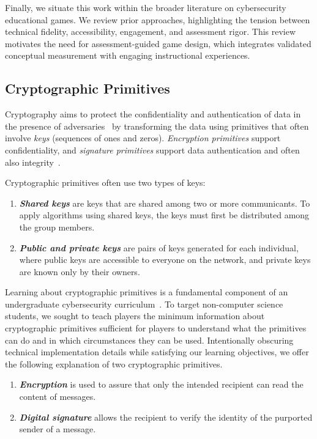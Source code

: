 \documentclass{uofithesis}
\begin{document}
Finally, we situate this work within the broader literature on cybersecurity educational games. We review prior approaches, highlighting the tension between technical fidelity, accessibility, engagement, and assessment rigor. This review motivates the need for assessment-guided game design, which integrates validated conceptual measurement with engaging instructional experiences.

\subsection{Cryptographic Primitives}
Cryptography aims to protect the confidentiality and authentication of
data in the presence of adversaries~\cite{WhatCryptography}
by transforming the data using primitives that often involve
\textit{keys} (sequences of ones and zeros).
\textit{Encryption primitives} support confidentiality, and \textit{signature primitives} support data authentication and often also integrity~\cite{TeachingPermitive}.

Cryptographic primitives often use two types of keys:
\begin{enumerate}
    \item \textit{\textbf{Shared keys}} are keys that are shared among two or more communicants. To apply algorithms using shared keys, the keys must first be distributed among the group members.
    \item \textit{\textbf{Public and private keys}} are pairs of keys generated for each individual, where public keys are accessible to everyone on the network, and private keys are known only by their owners.
\end{enumerate}
Learning about cryptographic primitives is a fundamental component of an undergraduate cybersecurity curriculum~\cite{TeachingPermitive}. 
To target non-computer science students, we sought to teach players the minimum information
about cryptographic primitives sufficient for players to understand 
what the primitives can do and in which circumstances they can be used.
Intentionally obscuring technical implementation details
while satisfying our learning objectives, we offer
the following explanation of two cryptographic primitives.
\begin{enumerate}
    \item \textbf{\textit{Encryption}} is used to assure that only the intended recipient can read the content of messages.
    \item  \textbf{\textit{Digital signature}} allows the recipient to verify the identity of the purported sender of a message.
\end{enumerate}
\end{document}
